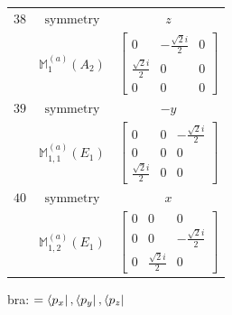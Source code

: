 \documentclass[fleqn,8pt,landscape]{jsarticle}
\begin{document}
\begin{longtable}{ccc}
$ 38 $ & $ \text{symmetry} $ & $ z $ \\
$  $ & $ \mathbb{M}_{1}^{(a)}(A_{2}) $ & $ \begin{bmatrix} 0 & - \frac{\sqrt{2} i}{2} & 0 \\ \frac{\sqrt{2} i}{2} & 0 & 0 \\ 0 & 0 & 0 \end{bmatrix} $ \\ \hline
$ 39 $ & $ \text{symmetry} $ & $ - y $ \\
$  $ & $ \mathbb{M}_{1,1}^{(a)}(E_{1}) $ & $ \begin{bmatrix} 0 & 0 & - \frac{\sqrt{2} i}{2} \\ 0 & 0 & 0 \\ \frac{\sqrt{2} i}{2} & 0 & 0 \end{bmatrix} $ \\ \hline
$ 40 $ & $ \text{symmetry} $ & $ x $ \\
$  $ & $ \mathbb{M}_{1,2}^{(a)}(E_{1}) $ & $ \begin{bmatrix} 0 & 0 & 0 \\ 0 & 0 & - \frac{\sqrt{2} i}{2} \\ 0 & \frac{\sqrt{2} i}{2} & 0 \end{bmatrix} $ \\ \hline
\end{longtable}
bra: $=\bra{p_{x}}, \bra{p_{y}}, \bra{p_{z}}$
\end{document}
